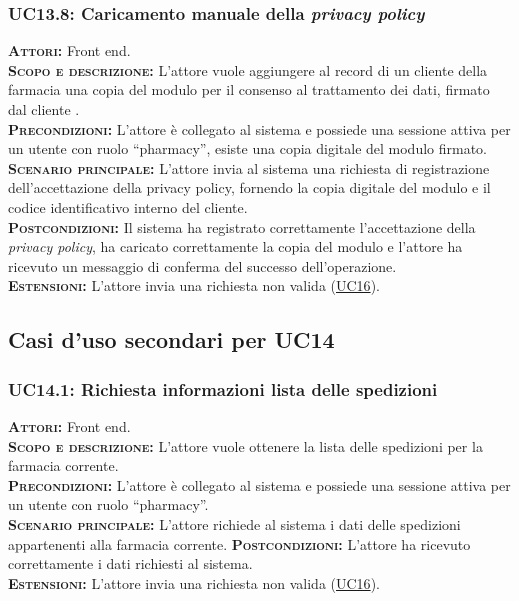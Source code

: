 \subsubsection{UC13.8: Caricamento manuale della \textit{privacy policy}}
\label{sec:UC138}
\textsc{\textbf{Attori:}} Front end.\\
\textsc{\textbf{Scopo e descrizione:}} L'attore vuole aggiungere al record di un cliente della farmacia una copia del modulo per il consenso al trattamento dei dati, firmato dal cliente .\\
\textsc{\textsc{\textbf{Precondizioni:}}} L'attore è collegato al sistema e possiede una sessione attiva per un utente con ruolo ``pharmacy'', esiste una copia digitale del modulo firmato.\\
\textsc{\textbf{Scenario principale:}} L'attore invia al sistema una richiesta di registrazione dell'accettazione della privacy policy, fornendo la copia digitale del modulo e il codice identificativo interno del cliente.\\
\textsc{\textbf{Postcondizioni:}} Il sistema ha registrato correttamente l'accettazione della \textit{privacy policy}, ha caricato correttamente la copia del modulo e l'attore ha ricevuto un messaggio di conferma del successo dell'operazione.\\
\textsc{\textbf{Estensioni:}} L'attore invia una richiesta non valida (\hyperref[sec:UC16]{UC16}).
    
\subsection{Casi d'uso secondari per UC14}\subsubsection{UC14.1: Richiesta informazioni lista delle spedizioni}
\label{sec:UC141}
\textsc{\textbf{Attori:}} Front end.\\
\textsc{\textbf{Scopo e descrizione:}} L'attore vuole ottenere la lista delle spedizioni per la farmacia corrente.\\
\textsc{\textsc{\textbf{Precondizioni:}}} L'attore è collegato al sistema e possiede una sessione attiva per un utente con ruolo ``pharmacy''.\\
\textsc{\textbf{Scenario principale:}} L'attore richiede al sistema i dati delle spedizioni appartenenti alla farmacia corrente.
\textsc{\textbf{Postcondizioni:}} L'attore ha ricevuto correttamente i dati richiesti al sistema.\\
\textsc{\textbf{Estensioni:}} L'attore invia una richiesta non valida (\hyperref[sec:UC16]{UC16}).\\

